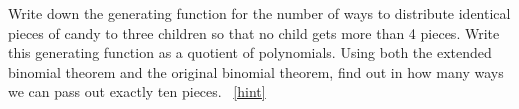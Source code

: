 \documentclass{book}
\begin{document}
\setcounter{project}{255}
\addtocounter{project}{-1}
\begin{activity}[]\label{candygenfn}
\hypertarget{p-1374}{}%
Write down the generating function for the number of ways to distribute identical pieces of candy to three children so that no child gets more than 4 pieces. Write this generating function as a quotient of polynomials. Using both the extended binomial theorem and the original binomial theorem, find out in how many ways we can pass out exactly ten pieces.%
~\hfill{\tiny\hyperlink{a-255}{[hint]}\hypertarget{q-255}{}}\end{activity}
\end{document}
